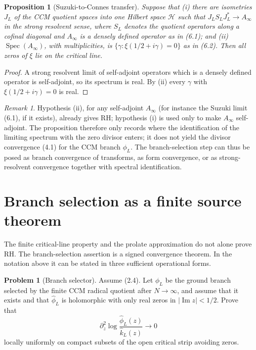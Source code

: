 \documentclass[11pt]{amsart}
\newtheorem{proposition}[theorem]{Proposition}
\theoremstyle{definition}
\newtheorem{problem}[theorem]{Problem}
\theoremstyle{remark}
\newtheorem{remark}[theorem]{Remark}
\DeclareMathOperator{\Spec}{Spec}
\begin{document}
\begin{proposition}[Suzuki-to-Connes transfer]
Suppose that (i) there are isometries \(J_L\) of the CCM quotient spaces
into one Hilbert space \(\mathcal H\) such that
\(J_LS_LJ_L^*\to A_\infty\) in the strong resolvent sense, where
\(S_L\) denotes the quotient operators along a cofinal diagonal and
\(A_\infty\) is a densely defined operator as in (6.1); and (ii)
\(\Spec(A_\infty)\), with multiplicities, is
\(\{\gamma:\xi(1/2+i\gamma)=0\}\) as in (6.2).  Then all zeros of
\(\xi\) lie on the critical line.
\end{proposition}

\begin{proof}
A strong resolvent limit of self-adjoint operators which is a densely
defined operator is self-adjoint, so its spectrum is real.  By (ii) every
\(\gamma\) with \(\xi(1/2+i\gamma)=0\) is real.
\end{proof}

\begin{remark}
Hypothesis (ii), for any self-adjoint \(A_\infty\) (for instance the
Suzuki limit (6.1), if it exists), already gives RH; hypothesis (i) is
used only to make \(A_\infty\) self-adjoint.  The proposition therefore
only records where the identification of the limiting spectrum with the
zero divisor enters; it does not yield the divisor convergence (4.1) for
the CCM branch \(\phi_L\).  The branch-selection step can thus be posed
as branch convergence of transforms, as form convergence, or as
strong-resolvent convergence together with spectral identification.
\end{remark}

\section{Branch selection as a finite source theorem}

The finite critical-line property and the prolate approximation do not
alone prove RH.  The branch-selection assertion is a signed convergence
theorem.  In
the notation above it can be stated in three sufficient operational forms.

\begin{problem}[Branch selector]
\label{prob:branch}
Assume (2.4).  Let \(\phi_L\) be the ground branch selected by the
finite CCM radical quotient after \(N\to\infty\), and assume that it
exists and that \(\widehat\phi_L\) is holomorphic with only real zeros
in \(|\operatorname{Im}z|<1/2\).  Prove that
\[
 \partial_z^2\log
 \frac{\widehat\phi_L(z)}{\widehat k_L(z)}
 \longrightarrow0
\tag{7.1}
\]
locally uniformly on compact subsets of the open critical strip avoiding
zeros.
\end{problem}
\end{document}
